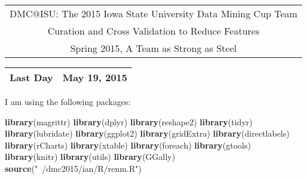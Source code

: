 \documentclass[10pt]{report}
\newenvironment{Shaded}{}{}
\newcommand{\KeywordTok}[1]{\textcolor[rgb]{0.00,0.44,0.13}{\textbf{{#1}}}}
\newcommand{\StringTok}[1]{\textcolor[rgb]{0.25,0.44,0.63}{{#1}}}
\newcommand{\NormalTok}[1]{{#1}}
\begin{document}
\thispagestyle{empty}%
\begin{center}%
    \renewcommand{\arraystretch}{1.5}%
    \begin{tabular}{c}%
       \Large{DMC@ISU: The 2015 Iowa State University Data Mining Cup Team}\\
       Curation and Cross Validation to Reduce Features\\
       Spring 2015, A Team as Strong as Steel \\
    \end{tabular}
\end{center}

\begin{center}
 \renewcommand{\arraystretch}{1.5}
 \begin{tabular*}{0.65\textwidth}{r@{:\hspace{.3cm}}l}
    \hline
    
    
    Last Day&  May 19, 2015\\
    \hline
 \end{tabular*}
\end{center}

I am using the following packages:

\begin{Shaded}
\begin{Highlighting}[]
   \KeywordTok{library}\NormalTok{(magrittr)}
   \KeywordTok{library}\NormalTok{(dplyr)}
   \KeywordTok{library}\NormalTok{(reshape2)}
   \KeywordTok{library}\NormalTok{(tidyr)}
   \KeywordTok{library}\NormalTok{(lubridate)}
   \KeywordTok{library}\NormalTok{(ggplot2)}
   \KeywordTok{library}\NormalTok{(gridExtra)}
   \KeywordTok{library}\NormalTok{(directlabels)}
   \KeywordTok{library}\NormalTok{(rCharts)}
   \KeywordTok{library}\NormalTok{(xtable)}
   \KeywordTok{library}\NormalTok{(foreach)}
   \KeywordTok{library}\NormalTok{(gtools)}
   \KeywordTok{library}\NormalTok{(knitr)}
   \KeywordTok{library}\NormalTok{(utils)}
   \KeywordTok{library}\NormalTok{(GGally)}
   \KeywordTok{source}\NormalTok{(}\StringTok{"~/dmc2015/ian/R/renm.R"}\NormalTok{)}
\end{Highlighting}
\end{Shaded}
\end{document}
